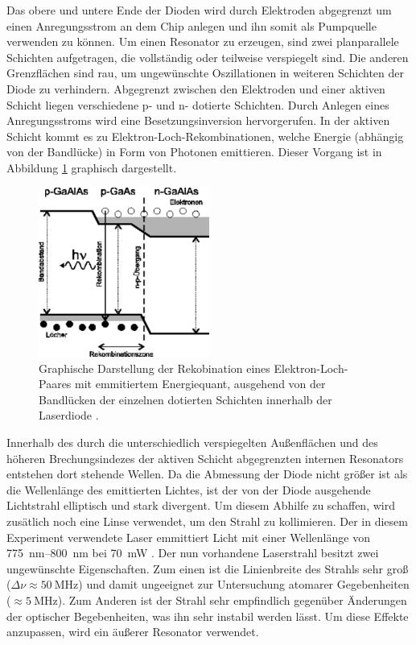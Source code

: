 Das obere und untere Ende der Dioden wird durch Elektroden abgegrenzt um einen
Anregungsstrom an dem Chip anlegen und ihn somit als Pumpquelle verwenden zu
können. Um einen Resonator zu erzeugen, sind zwei planparallele Schichten
aufgetragen, die vollständig oder teilweise verspiegelt sind. Die anderen
Grenzflächen sind rau, um ungewünschte Oszillationen in weiteren Schichten der
Diode zu verhindern. Abgegrenzt zwischen den Elektroden und einer aktiven Schicht
liegen verschiedene p- und n- dotierte Schichten. Durch Anlegen eines
Anregungsstroms wird eine Besetzungsinversion hervorgerufen. In der aktiven
Schicht kommt es zu Elektron-Loch-Rekombinationen, welche Energie (abhängig von der
Bandlücke) in Form von Photonen emittieren. Dieser Vorgang ist in Abbildung
\ref{fig:recombition} graphisch dargestellt.
\begin{figure}[htb]
  \centering
  \includegraphics[width=0.5\textwidth]{images/recombition.pdf}
  \caption{Graphische Darstellung der Rekobination eines Elektron-Loch-Paares mit
  emmitiertem Energiequant, ausgehend von der Bandlücken der einzelnen dotierten
  Schichten innerhalb der Laserdiode \cite{recomb}.}
  \label{fig:recombition}
\end{figure}

Innerhalb des durch die unterschiedlich
verspiegelten Außenflächen und des höheren Brechungsindezes der aktiven Schicht
abgegrenzten internen Resonators entstehen dort stehende Wellen. Da die Abmessung
der Diode nicht größer ist als die Wellenlänge des emittierten Lichtes, ist der
von der Diode ausgehende Lichtstrahl elliptisch und stark divergent. Um diesem
Abhilfe zu schaffen, wird zusätlich noch eine Linse verwendet, um den Strahl zu
kollimieren.
Der in diesem Experiment verwendete Laser emmittiert Licht
mit einer Wellenlänge von \SIrange{775}{800}{\nano\meter} bei \SI{70}{\milli\watt}
\cite{Sanyo}.
Der nun vorhandene Laserstrahl besitzt zwei ungewünschte Eigenschaften. Zum einen
ist die Linienbreite des Strahls sehr groß ($\Delta\nu \approx \SI{50}{\mega\hertz}$)
und damit ungeeignet zur Untersuchung atomarer Gegebenheiten ($ \approx \SI{5}{\mega\hertz}$).
Zum Anderen ist der Strahl sehr empfindlich gegenüber Änderungen der optischer Begebenheiten,
was ihn sehr instabil werden lässt. Um diese Effekte anzupassen, wird ein äußerer
Resonator verwendet.

